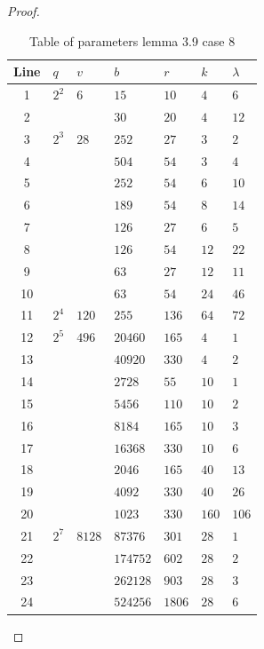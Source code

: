 \documentclass[a4paper,twopage,reqno,12pt]{amsart}
\theoremstyle{definition}
\numberwithin{equation}{section}
\begin{document}
\begin{proof}
\begin{table}[H]
    \centering
    \tiny
    \caption{\small Table of parameters lemma 3.9 case 8}\label{tab:3.9.8}
    \begin{tabular}{cllllll}
    \toprule
    Line &$q$ &$v$   & $b$    & $r$  & $k$ &$\lambda$\\
    \toprule
    1 &$2^2$&$6   $&$15$   &$10  $&$4  $&$6   $\\
    2 &     &      &$30$   &$20  $&$4  $&$12  $\\
    3 & $2^3$&   $28$&   $252$   & $27$ &$3$ & $2$ \\
    4 & & & $504$   & $54$ &$3$ & $4$ \\
    5 &      &      & $252$ &$54$ &$6$ & $10$\\
    6 &     &      &$189   $&$54  $&$8  $&$14  $\\
    7 &     &      &$126   $&$27  $&$6  $&$5   $\\
    8 &     &      &$126   $&$54  $&$12 $&$22  $\\
    9 &     &      &$63    $&$27  $&$12 $&$11  $\\
    10&     &      &$63    $&$54  $&$24 $&$46  $\\
    11&$2^4$&$120 $&$255   $&$136 $&$64 $&$72  $\\
    12& $2^5$&   $496$&   $20460$   &  $165$   &$4$ & $1$ \\
    13 & & & $40920$   & $330$ &$4$ & $2$ \\  
14&                    &                     &   $2728$   &  $55$  &$10$ & $1$ \\
15 & & & $5456$   & $110$ &$10$ & $2$ \\    
    16&     &      &$8184$& $165$  & $10$ & $3$  \\
    17&     &      &$16368 $&$330 $&$10 $&$6   $\\
    18&     &      &$2046  $&$165 $&$40 $&$13  $\\
    19&     &      &$4092  $&$330 $&$40 $&$26  $\\
    20&     &      &$1023  $&$330 $&$160$&$106 $\\
    21& $2^7$&   $8128$&  $87376$   &  $301$   &$28$ & $1$ \\

22 & & & $174752$  & $602$ &$28$ & $2$ \\
    
    23&                  &      &$262128$&$903 $&$28 $&$3   $\\
    24&     &      &$524256$&$1806$&$28 $&$6   $\\
    \bottomrule
\end{tabular}
\end{table}


\end{proof}
\end{document}

